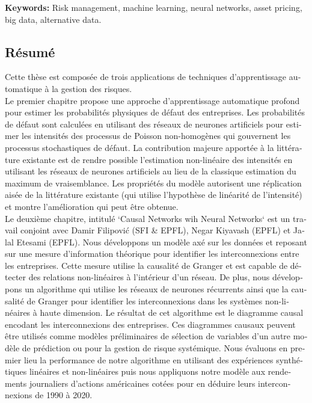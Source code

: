 \textbf{Keywords:} Risk management, machine learning, neural networks, asset pricing, big data, alternative data.

\begin{otherlanguage}{french}
\cleardoublepage
\chapter*{Résumé}

Cette thèse est composée de trois applications de techniques d'apprentissage automatique à la gestion des risques. \\

Le premier chapitre propose une approche d'apprentissage automatique profond pour estimer les probabilités physiques de défaut des entreprises. Les probabilités de défaut sont calculées en utilisant des réseaux de neurones artificiels pour estimer les intensités des processus de Poisson non-homogènes qui gouvernent les processus stochastiques de défaut. La contribution majeure apportée à la littérature existante est de rendre possible l'estimation non-linéaire des intensités en utilisant les réseaux de neurones artificiels au lieu de la classique estimation du maximum de vraisemblance. Les propriétés du modèle autorisent une réplication aisée de la littérature existante (qui utilise l'hypothèse de linéarité de l'intensité) et montre l'amélioration qui peut être obtenue. \\

Le deuxième chapitre, intitulé `Causal Networks wih Neural Networks` est un travail conjoint avec Damir Filipović (SFI \& EPFL), Negar Kiyavash (EPFL) et Jalal Etesami (EPFL). Nous développons un modèle axé sur les données et reposant sur une mesure d'information théorique pour identifier les interconnexions entre les entreprises. Cette mesure utilise la causalité de Granger et est capable de détecter des relations non-linéaires à l'intérieur d'un réseau. De plus, nous développons un algorithme qui utilise les réseaux de neurones récurrents ainsi que la causalité de Granger pour identifier les interconnexions dans les systèmes non-linéaires à haute dimension. Le résultat de cet algorithme est le diagramme causal encodant les interconnexions des entreprises. Ces diagrammes causaux peuvent être utilisés comme modèles préliminaires de sélection de variables d'un autre modèle de prédiction ou pour la gestion de risque systémique. Nous évaluons en premier lieu la performance de notre algorithme en utilisant des expériences synthétiques linéaires et non-linéaires puis nous appliquons notre modèle aux rendements journaliers d'actions américaines cotées pour en déduire leurs interconnexions de 1990 à 2020. \\


\end{otherlanguage}
